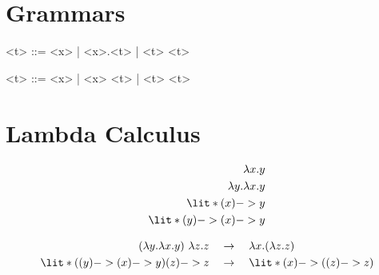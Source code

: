 \documentclass[11hpt]{article}
\begin{document}
\section{Grammars}

\begin{grammar}
<t> ::= <x> | <\lambda x>.<t> | <t> <t>
\end{grammar}

\begin{grammar}
<t> ::= <x> | \lit*{(} <x> \lit*{) ->} <t> | <t> <t>
\end{grammar}

\section{Lambda Calculus}

\begin{align*}
\lambda x.y \\
\lambda y.\lambda x.y \\
\lit*{(x) -> y} \\
\lit*{(y) -> (x) -> y}
\end{align*}

\begin{align*}
(\lambda y.\lambda x.y) \ \lambda z.z \quad &\rightarrow \quad \lambda x.(\lambda z.z) \\
\lit*{((y) -> (x) -> y) (z) -> z} \quad &\rightarrow \quad \lit*{(x) -> ((z) -> z)}
\end{align*}
\end{document}
